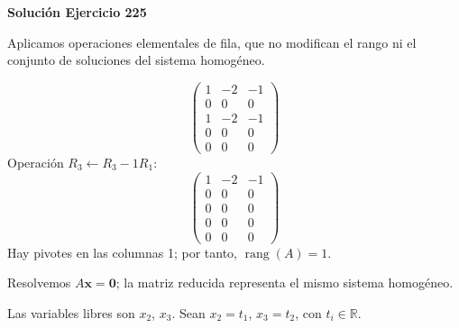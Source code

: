 \documentclass[12pt]{article}
\newcommand{\rang}{\operatorname{rang}}
\newcommand{\vect}[1]{\boldsymbol{#1}}
\begin{document}
\par\bigskip\noindent\textbf{Solución Ejercicio 225}\par\nobreak
Aplicamos operaciones elementales de fila, que no modifican el rango ni el conjunto de soluciones del sistema homogéneo.

\[
\begin{pmatrix}1&-2&-1\\0&0&0\\1&-2&-1\\0&0&0\\0&0&0\end{pmatrix}
\]
Operación $R_{3}\leftarrow R_{3}-1R_{1}$:
\[
\begin{pmatrix}1&-2&-1\\0&0&0\\0&0&0\\0&0&0\\0&0&0\end{pmatrix}
\]
Hay pivotes en las columnas 1; por tanto, $\boxed{\rang(A)=1}$.

Resolvemos $A\vect x=\vect0$; la matriz reducida representa el mismo sistema homogéneo.

Las variables libres son $x_{2}$, $x_{3}$. Sean $x_{2}=t_{1}$, $x_{3}=t_{2}$, con $t_i\in\mathbb R$.
\end{document}
